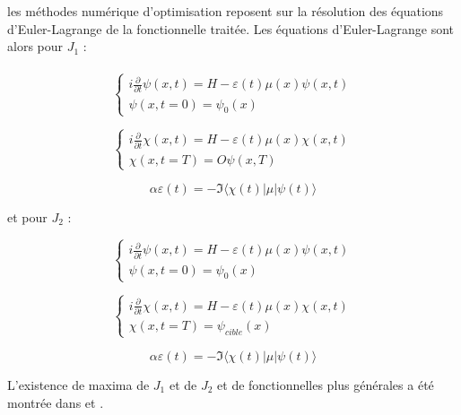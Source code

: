 les méthodes numérique d’optimisation reposent sur la résolution des équations d’Euler-Lagrange de la fonctionnelle traitée. Les équations d'Euler-Lagrange sont alors pour $J_1$ :\\\\

\begin{equation}
\begin{cases}
i \frac{\partial}{\partial t} \psi (x,t) = H - \varepsilon(t)\mu(x)\psi(x,t)\\
\psi(x,t=0)=\psi_0(x)
\end{cases}
\end{equation}

\begin{equation}
\begin{cases}
i \frac{\partial}{\partial t} \chi (x,t) = H - \varepsilon(t)\mu(x)\chi(x,t)\\
\chi(x,t=T)=O\psi(x,T)
\end{cases}
\end{equation}

\begin{equation}
\alpha \varepsilon(t) = -\Im \langle \chi(t)|\mu|\psi(t)\rangle 
\end{equation}

et pour $J_2$ :

\begin{equation}
\begin{cases}
i \frac{\partial}{\partial t} \psi (x,t) = H - \varepsilon(t)\mu(x)\psi(x,t)\\
\psi(x,t=0)=\psi_0(x)
\end{cases}
\end{equation}

\begin{equation}
\begin{cases}
i \frac{\partial}{\partial t} \chi (x,t) = H - \varepsilon(t)\mu(x)\chi(x,t)\\
\chi(x,t=T)=\psi_{cible}(x)
\end{cases}
\end{equation}

\begin{equation}
\alpha \varepsilon(t) = -\Im \langle \chi(t)|\mu|\psi(t)\rangle 
\end{equation}

L'existence de maxima de $J_1$ et de $J_2$ et de fonctionnelles plus générales a été montrée dans \cite{Cances} et \cite{Baudouin}.

